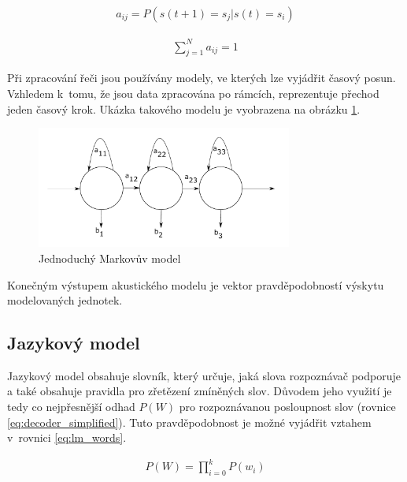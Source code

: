 \begin{equation} \label{eq:a_calc}
\begin{gathered}
a_{ij} = P(s(t+1) =s_j|s(t) = s_i)
\end{gathered}
\end{equation}

\begin{equation} \label{eq:hmm_a_sum}
\begin{gathered}
\sum_{j=1}^{N}a_{ij} = 1
\end{gathered}
\end{equation}

Při zpracování řeči jsou používány modely, ve kterých lze vyjádřit časový posun. Vzhledem k~tomu, že jsou data zpracována po rámcích, reprezentuje přechod jeden časový krok. Ukázka takového modelu je vyobrazena na obrázku \ref{fig:simple_hmm}.

\begin{figure}[H]\label{fig:simple_hmm}
	\centering
		\includegraphics[height=4cm]{obrazky-figures/simple_hmm.pdf}
        \caption{Jednoduchý Markovův model}
\end{figure}

Konečným výstupem akustického modelu je vektor pravděpodobností výskytu modelovaných jednotek.

\subsection{Jazykový model}\label{sec:language_model}
Jazykový model obsahuje slovník, který určuje, jaká slova rozpoznávač podporuje a také obsahuje pravidla pro zřetězení zmíněných slov. Důvodem jeho využití je tedy co nejpřesnější odhad $P(W)$ pro rozpoznávanou posloupnost slov (rovnice \ref{eq:decoder_simplified}). Tuto pravděpodobnost je možné vyjádřit vztahem v~rovnici \ref{eq:lm_words}. 

\begin{equation} \label{eq:lm_words}
\begin{gathered}
P(W) = \prod^{k}_{i = 0}P(w_i)
\end{gathered}
\end{equation}

